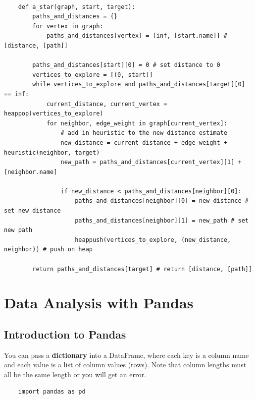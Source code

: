 \documentclass[11pt, a4paper]{article}
\begin{document}
\begin{spacing}{1.1}
	\begin{lstlisting}
	
	def a_star(graph, start, target):
		paths_and_distances = {}
		for vertex in graph:
			paths_and_distances[vertex] = [inf, [start.name]] # [distance, [path]]
		
		paths_and_distances[start][0] = 0 # set distance to 0
		vertices_to_explore = [(0, start)]
		while vertices_to_explore and paths_and_distances[target][0] == inf:
			current_distance, current_vertex = heappop(vertices_to_explore)
			for neighbor, edge_weight in graph[current_vertex]:
				# add in heuristic to the new distance estimate
				new_distance = current_distance + edge_weight + heuristic(neighbor, target)
				new_path = paths_and_distances[current_vertex][1] + [neighbor.name] 
				
				if new_distance < paths_and_distances[neighbor][0]:
					paths_and_distances[neighbor][0] = new_distance # set new distance
					paths_and_distances[neighbor][1] = new_path # set new path
					heappush(vertices_to_explore, (new_distance, neighbor)) # push on heap
		
		return paths_and_distances[target] # return [distance, [path]] \end{lstlisting} \newpage
		

	\section{Data Analysis with Pandas}
	\subsection{Introduction to Pandas}
	You can pass a \textbf{dictionary} into a DataFrame, where each key is a column name and each value is a list of column values (rows). Note that column lengths must all be the same length or you will get an error.
	\begin{lstlisting}
	import pandas as pd
	

\end{lstlisting}
\end{spacing}
\end{document}
